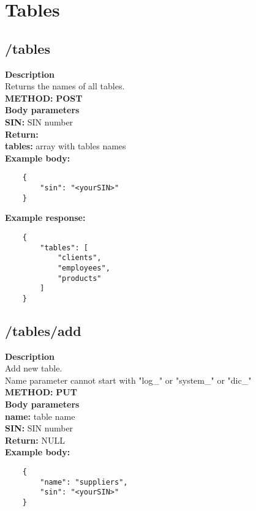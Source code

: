 \documentclass[a4paper, 12pt]{report}
\begin{document}
\section{Tables}

\subsection{/tables}
\textbf{\color{redText} Description} \\
Returns the names of all tables. \\
\textbf{\color{redText} METHOD: } \textbf{POST} \\
\textbf{\color{redText} Body parameters} \\
\textbf{SIN: } SIN number\\
\textbf{\color{redText} Return: } \\
\textbf{tables: } array with tables names \\
\textbf{\color{redText} Example body: }
\begin{lstlisting}
    {
        "sin": "<yourSIN>"
    }
\end{lstlisting}
\textbf{\color{redText} Example response: }
\begin{lstlisting}
    {
        "tables": [
            "clients",
            "employees",
            "products"
        ]
    }
\end{lstlisting}

\subsection{/tables/add}
\textbf{\color{redText} Description} \\
Add new table. \\
Name parameter cannot start with "log\_" or "system\_" or "dic\_"\\
\textbf{\color{redText} METHOD: } \textbf{PUT} \\
\textbf{\color{redText} Body parameters} \\
\textbf{name: } table name\\
\textbf{SIN: } SIN number\\
\textbf{\color{redText} Return: } NULL \\
\textbf{\color{redText} Example body: }
\begin{lstlisting}
    {
        "name": "suppliers",
        "sin": "<yourSIN>"
    }
\end{lstlisting}
\end{document}
